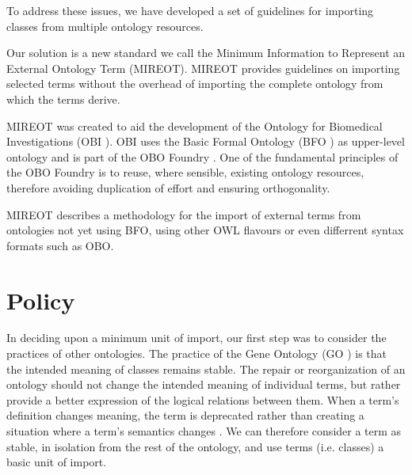 \documentclass[a4paper,10pt,twocolumn]{article}
\begin{document}

To address these issues, we have developed a set of guidelines for importing classes from multiple ontology resources.


Our solution is a new standard we call the Minimum Information to Represent an External Ontology Term (MIREOT).
MIREOT provides guidelines on importing selected terms without the overhead of importing the complete ontology from which the terms derive. 

MIREOT was created to aid the development of the Ontology for Biomedical Investigations (OBI  \cite{RefWorks:1507}).
OBI uses the Basic Formal Ontology (BFO \cite{RefWorks:1557}) as upper-level ontology and is part of the OBO Foundry \cite{RefWorks:1472}. 
One of the fundamental principles of the OBO Foundry is to reuse, where sensible, existing ontology resources, therefore avoiding duplication of effort and ensuring orthogonality.


MIREOT describes a methodology for the import of external terms from ontologies not yet using BFO, using other OWL flavours or even differrent syntax formats such as OBO.

\section*{Policy}

In deciding upon a minimum unit of import, our first step was to consider the practices of other ontologies.
The practice of the Gene Ontology (GO \cite{RefWorks:79}) is that the intended meaning of classes remains stable.
The repair or reorganization of an ontology should not change the intended meaning of individual terms, but rather provide a better expression of the logical relations between them.
When a term's definition changes meaning, the term is deprecated rather than creating a situation where a term's semantics changes \cite{RefWorks:1560}.
We can therefore consider a term as stable, in isolation from the rest of the ontology, and use terms (i.e. classes) a basic unit of import. 
\end{document}
